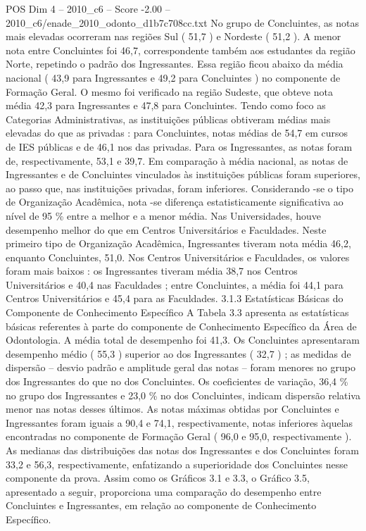 \begin{textsample}{POS Dim 4 – 2010\_c6 – Score -2.00 – 2010\_c6/enade\_2010\_odonto\_d1b7c708cc.txt}
No grupo de Concluintes, as notas mais elevadas ocorreram nas regiões Sul ( 51,7 ) e Nordeste ( 51,2 ).
A menor nota entre Concluintes foi 46,7, correspondente também aos estudantes da região Norte, repetindo o padrão dos Ingressantes.
Essa região ficou abaixo da média nacional ( 43,9 para Ingressantes e 49,2 para Concluintes ) no componente de Formação Geral.
O mesmo foi verificado na região Sudeste, que obteve nota média 42,3 para Ingressantes e 47,8 para Concluintes.
Tendo como foco as Categorias Administrativas, as instituições públicas obtiveram médias mais elevadas do que as privadas : para Concluintes, notas médias de 54,7 em cursos de IES públicas e de 46,1 nos das privadas.
Para os Ingressantes, as notas foram de, respectivamente, 53,1 e 39,7.
Em comparação à média nacional, as notas de Ingressantes e de Concluintes vinculados às instituições públicas foram superiores, ao passo que, nas instituições privadas, foram inferiores.
Considerando -se o tipo de Organização Acadêmica, nota -se diferença estatisticamente significativa ao nível de 95 \% entre a melhor e a menor média.
Nas Universidades, houve desempenho melhor do que em Centros Universitários e Faculdades.
Neste primeiro tipo de Organização Acadêmica, Ingressantes tiveram nota média 46,2, enquanto Concluintes, 51,0.
Nos Centros Universitários e Faculdades, os valores foram mais baixos : os Ingressantes tiveram média 38,7 nos Centros Universitários e 40,4 nas Faculdades ; entre Concluintes, a média foi 44,1 para Centros Universitários e 45,4 para as Faculdades. 3.1.3 Estatísticas Básicas do Componente de Conhecimento Específico A Tabela 3.3 apresenta as estatísticas básicas referentes à parte do componente de Conhecimento Específico da Área de Odontologia.
A média total de desempenho foi 41,3.
Os Concluintes apresentaram desempenho médio ( 55,3 ) superior ao dos Ingressantes ( 32,7 ) ; as medidas de dispersão – desvio padrão e amplitude geral das notas – foram menores no grupo dos Ingressantes do que no dos Concluintes.
Os coeficientes de variação, 36,4 \% no grupo dos Ingressantes e 23,0 \% no dos Concluintes, indicam dispersão relativa menor nas notas desses últimos.
As notas máximas obtidas por Concluintes e Ingressantes foram iguais a 90,4 e 74,1, respectivamente, notas inferiores àquelas encontradas no componente de Formação Geral ( 96,0 e 95,0, respectivamente ).
As medianas das distribuições das notas dos Ingressantes e dos Concluintes foram 33,2 e 56,3, respectivamente, enfatizando a superioridade dos Concluintes nesse componente da prova.
Assim como os Gráficos 3.1 e 3.3, o Gráfico 3.5, apresentado a seguir, proporciona uma comparação do desempenho entre Concluintes e Ingressantes, em relação ao componente de Conhecimento Específico.

\end{textsample}
